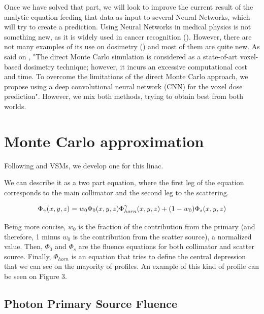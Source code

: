 \documentclass[openany]{article}
\begin{document}
Once we have solved that part, we will look to improve the current result of the analytic equation feeding that data as input to several Neural Networks, which will try to create a prediction. Using Neural Networks in medical physics is not something new, as it is widely used in cancer recognition (\cite{BOTTACI1997469, Ganesan, Shen2019}). However, there are not many examples of its use on dosimetry (\cite{G_tz_2020, Jiang, Lee2019}) and most of them are quite new. As said on \cite{Lee2019}, "The direct Monte Carlo simulation is considered as a state-of-art voxel-based dosimetry technique; however, it incurs an excessive computational cost and time. To overcome the limitations of the direct Monte Carlo approach, we propose using a deep convolutional neural network (CNN) for the voxel dose prediction". However, we mix both methods, trying to obtain best from both worlds.

\newpage
{}

\section{Monte Carlo approximation}


Following \cite{Fippel} and \cite{Gonzalez2015} VSMs, we develop one for this linac.

We can describe it as a two part equation, where the first leg of the equation corresponds to the main collimator and the second leg to the scattering. 

\begin{equation}
    \centering
    \Phi_\gamma (x,y,z) = w_0 \Phi_0(x,y,z) \Phi_{horn}^\gamma (x,y,z) + (1-w_0)\Phi_s(x,y,z) 
\end{equation}



Being more concise, \(w_0\) is the fraction of the contribution from the primary (and therefore, 1 minus \(w_0\) is the contribution from the scatter source), a normalized value. Then, \(\Phi_0\) and \(\Phi_s\) are the fluence equations for both collimator and scatter source. Finally, \(\Phi_{horn}\) is an equation that tries to define the central depression that we can see on the mayority of profiles. An example of this kind of profile can be seen on Figure 3.\\



\subsection{Photon Primary Source Fluence}
\end{document}
